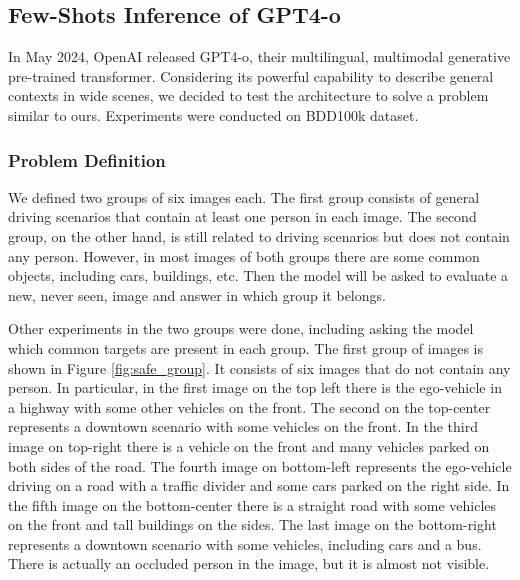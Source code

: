 \subsection{Few-Shots Inference of GPT4-o}
In May 2024, OpenAI released GPT4-o, their multilingual, multimodal generative 
pre-trained transformer. Considering its powerful capability to describe general 
contexts in wide scenes, we decided to test the architecture to solve a problem 
similar to ours. Experiments were conducted on BDD100k dataset.

\subsubsection{Problem Definition}
We defined two groups of six images each. The first group consists of general 
driving scenarios that contain at least one person in each image. 
The second group, on the other hand, is still related to driving scenarios but 
does not contain any person. However, in most images of both groups there are 
some common objects, including cars, buildings, etc.
Then the model will be asked to evaluate a new, never seen, image and answer 
in which group it belongs.

Other experiments in the two groups were done, including asking the model which 
common targets are present in each group.
The first group of images is shown in Figure \ref{fig:safe_group}. It consists
of six images that do not contain any person. In particular, in the first image 
on the top left there is the ego-vehicle in a highway with some other vehicles 
on the front. The second on the top-center represents a downtown scenario with 
some vehicles on the front. In the third image on top-right there is a vehicle 
on the front and many vehicles parked on both sides of the road. The fourth 
image on bottom-left represents the ego-vehicle driving on a road with a traffic 
divider and some cars parked on the right side. In the fifth image on the 
bottom-center there is a straight road with some vehicles on the front and tall 
buildings on the sides. The last image on the bottom-right represents a 
downtown scenario with some vehicles, including cars and a bus. There is 
actually an occluded person in the image, but it is almost not visible.


